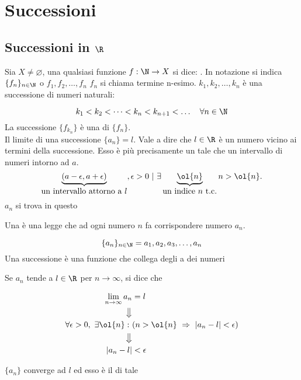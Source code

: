 \documentclass[../analisi.tex]{subfiles}
\begin{document}
\section{Successioni}
\subsection{Successioni in $\R$}
Sia $X \neq \varnothing$, una qualsiasi funzione $f: \N \to X$ si dice: 
. \newline
In notazione si indica $ \{ f_n \}_{n \in \N} $ o $f_1, f_2, \dots , f_n $ \newline
$ f_n $ si chiama termine n-esimo. \newline
$ k_1, k_2, \dots , k_n $ è una successione di numeri naturali:

\begin{equation}
	k_1 < k_2 < \dots < k_n < k_{n+1} < \dots \quad \forall n \in \N
\end{equation}
La successione $ \{ f_{k_n} \} $ è una  di $ \{ f_n \} $.\\
Il limite di una successione $ \{ a_n \} = l $. Vale a dire che $ l \in \R $
è un numero vicino ai termini della successione. Esso è più precisamente un 
 tale che  un intervallo di numeri intorno
ad $a$.
\bda
\begin{equation}
	\underbrace{( a - \epsilon, a + \epsilon)}_{\mbox{un intervallo attorno a 
	$l$}} , \epsilon > 0\ |\ \exists 
	\underbrace{\ol{n}}_{\mbox{un indice $n$ t.c.}} n > \ol{n}.
\end{equation}
$a_n$ si trova in questo 

\begin{defn}[Successione]
Una  è una legge che ad ogni numero  $n$ 
fa corrispondere numero  $a_n$.

\begin{equation}
	\{ a_n \}_{n \in \N} = a_1, a_2, a_3, \dots , a_n
\end{equation}
Una successione è una funzione che collega degli  a dei numeri 
\end{defn}


\begin{defn}
Se $ a_n$ tende a $ l \in \R$ per $n \to \infty$, si dice che 


\begin{equation}
	\begin{aligned}
 	\lim \limits_{n \to \infty} a_n &= l\\
	\big\Downarrow\\
	\forall \epsilon > 0,\ \exists \ol{n}:\
	&( n > \ol{n}\ \Rightarrow\ | a_n - l | < \epsilon )\\
	\big\Downarrow\\
	| a_n - l | &< \epsilon
	\end{aligned}
\end{equation}

$ \{ a_n \} $ converge ad $l$ ed esso è il  di tale 
\end{defn}
\end{document}
